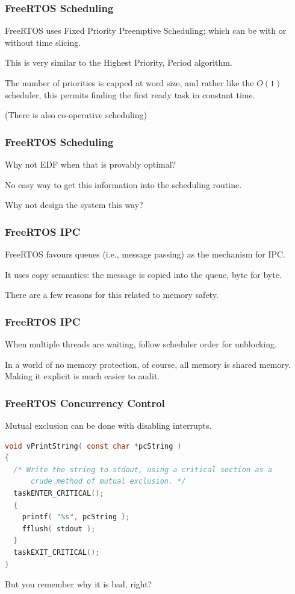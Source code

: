 \begin{frame}
\frametitle{FreeRTOS Scheduling}

FreeRTOS uses Fixed Priority Preemptive Scheduling; which can be with or without time slicing.

This is very similar to the Highest Priority, Period algorithm.

The number of priorities is capped at word size, and rather like the $O(1)$ scheduler, this permits finding the first ready task in constant time.

(There is also co-operative scheduling)
\end{frame}


\begin{frame}
\frametitle{FreeRTOS Scheduling}

Why not EDF when that is provably optimal?

No easy way to get this information into the scheduling routine. 

Why not design the system this way?

\end{frame}


\begin{frame}
\frametitle{FreeRTOS IPC}

FreeRTOS favours queues (i.e., message passing) as the mechanism for IPC.

It uses copy semantics: the message is copied into the queue, byte for byte.

There are a few reasons for this related to memory safety.

\end{frame}


\begin{frame}
\frametitle{FreeRTOS IPC}


When multiple threads are waiting, follow scheduler order for unblocking.

In a world of no memory protection, of course, all memory is shared memory.\\
\quad Making it explicit is much easier to audit.

\end{frame}


\begin{frame}[fragile]
\frametitle{FreeRTOS Concurrency Control}

Mutual exclusion can be done with disabling interrupts.

\begin{lstlisting}[language=C]
void vPrintString( const char *pcString )
{
  /* Write the string to stdout, using a critical section as a 
      crude method of mutual exclusion. */
  taskENTER_CRITICAL();
  {
    printf( "%s", pcString );
    fflush( stdout );
  }
  taskEXIT_CRITICAL();
}
\end{lstlisting}

But you remember why it is bad, right?

\end{frame}


